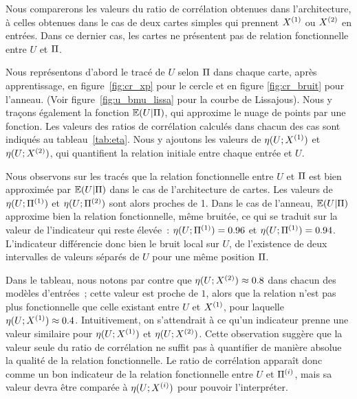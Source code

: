 \documentclass[../main]{subfiles}
\begin{document}
Nous comparerons les valeurs du ratio de corrélation obtenues dans l'architecture, à celles obtenues dans le cas de deux cartes simples qui prennent $X^{({1})}$ ou $X^{({2})}$ en entrées. 
Dans ce dernier cas, les cartes ne présentent pas de relation fonctionnelle entre $U$ et $\Pi$.

Nous représentons d'abord le tracé de $U$ selon $\Pi$ dans chaque carte, après apprentissage, en figure~\ref{fig:cr_xp} pour le cercle et en figure \ref{fig:cr_bruit} pour l'anneau. (Voir figure~\ref{fig:u_bmu_lissa} pour la courbe de Lissajous).
Nous y traçons également la fonction $\mathbb{E}(U|\Pi)$, qui approxime le nuage de points par une fonction. 
Les valeurs des ratios de corrélation calculés dans chacun des cas sont indiqués au tableau~\ref{tab:eta}.
Nous y ajoutons les valeurs de $\eta(U;X^{({1})})$ et $\eta(U;X^{({2})})$, qui quantifient la relation initiale entre chaque entrée et $U$.


Nous observons sur les tracés que la relation fonctionnelle entre $U$ et $\Pi$ est bien approximée par $\mathbb{E}(U|\Pi)$ dans le cas de l'architecture de cartes. Les valeurs de $\eta(U;\Pi^{({1})})$ et $\eta(U;\Pi^{({2})})$ sont alors proches de 1. 
Dans le cas de l'anneau, $\mathbb{E}(U|\Pi)$ approxime bien la relation fonctionnelle, même bruitée, ce qui se traduit sur la valeur de l'indicateur qui reste élevée~: $\eta(U;\Pi^{({1})}) = 0.96$ et  $\eta(U;\Pi^{({1})}) = 0.94$. 
L'indicateur différencie donc bien le bruit local sur $U$, de l'existence de deux intervalles de valeurs séparés de $U$ pour une même position $\Pi$.

Dans le tableau, nous notons par contre que $\eta(U;X^{({2})}) \approx 0.8$ dans chacun des modèles d'entrées~; cette valeur est proche de $1$, alors que la relation n'est pas \og plus fonctionnelle \fg{} que celle existant entre $U$ et $X^{({1})}$, pour laquelle $\eta(U;X^{({1})}) \approx 0.4$. Intuitivement, on s'attendrait à ce qu'un indicateur prenne une valeur similaire pour $\eta(U;X^{({1})})$ et $\eta(U;X^{({2})})$. Cette observation suggère que la valeur seule du ratio de corrélation ne suffit pas à quantifier de manière absolue la qualité de la relation fonctionnelle.
Le ratio de corrélation apparaît donc comme un bon indicateur de la relation fonctionnelle entre $U$ et $\Pi^{({i})}$, mais sa valeur devra être comparée à $\eta(U;X^{({i})})$ pour pouvoir l'interpréter.
\end{document}
